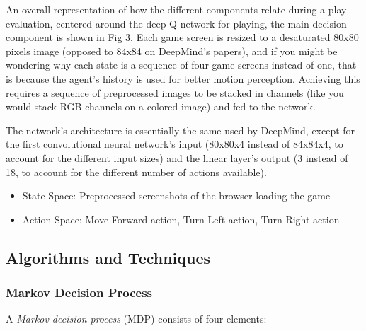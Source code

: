 \documentclass[a4paper]{article}
\begin{document}
An overall representation of how the different components relate during a play evaluation, centered around the deep Q-network for playing, the main decision component is shown in Fig 3. Each game screen is resized to a desaturated 80x80 pixels image (opposed to 84x84 on DeepMind's papers), and if you might be wondering why each state is a sequence of four game screens instead of one, that is because the agent's history is used for better motion perception. Achieving this requires a sequence of preprocessed images to be stacked in channels (like you would stack RGB channels on a colored image) and fed to the network.

The network's architecture is essentially the same used by DeepMind, except for the first convolutional neural network's input (80x80x4 instead of 84x84x4, to account for the different input sizes) and the linear layer's output (3 instead of 18, to account for the different number of actions available).

\begin{itemize}
		
	\item State Space: {Preprocessed screenshots of the browser loading the game}
	
	\item Action Space: {Move Forward action, Turn Left action, Turn Right action}

\end{itemize}

\subsection{Algorithms and Techniques}

\subsubsection{Markov Decision Process}

A \emph{Markov decision process} (MDP) consists of four elements:
\end{document}
